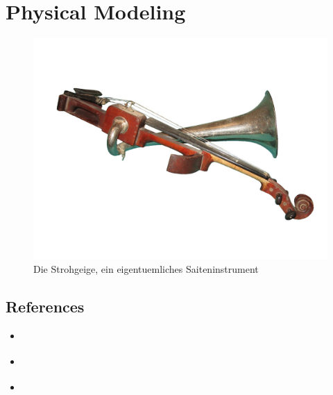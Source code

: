 \chapter{Physical Modeling}
\label{Karplus}

\begin{figure}[h]
  \begin{center}
    \includegraphics[width = 14cm]{img/strohgeige.jpg}
    \caption{Die Strohgeige, ein eigentuemliches Saiteninstrument}
    \label{fig:metering}
  \end{center}
\end{figure}


\section{References}

\begin{itemize}
  \item \cite{bilbao_numerical_2009}
  \item \cite{smith_physical_2010}
  \item \cite{cook_real_2002}
\end{itemize}






